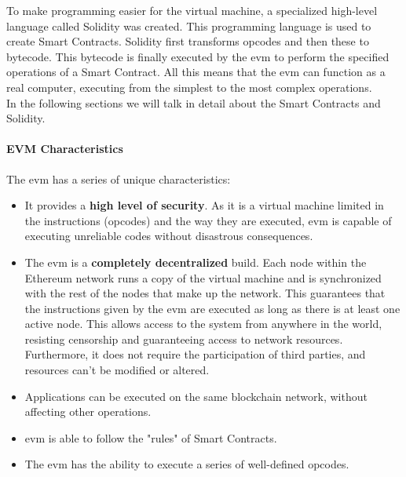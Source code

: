 \documentclass[a4paper, 12pt]{article} %
\begin{document}
                To make programming easier for the virtual machine, a specialized high-level language called Solidity was created. This programming language is used to create Smart Contracts. Solidity first transforms opcodes and then these to bytecode. This bytecode is finally executed by the \acrshort{evm} to perform the specified operations of a  Smart Contract. All this means that the \acrshort{evm} can function as a real computer, executing from the simplest to the most complex operations.\\
                
                In the following sections we will talk in detail about the Smart Contracts and Solidity.
                
            \paragraph{EVM Characteristics}
                The \acrshort{evm} has a series of unique characteristics\cite{ethereumGavin}\cite{ethereumDocu}:
                \begin{itemize}
                    \item It provides a \textbf{high level of security}. As it is a virtual machine limited in the instructions (opcodes) and the way they are executed, \acrshort{evm} is capable of executing unreliable codes without disastrous consequences.
                    \item The \acrshort{evm} is a \textbf{completely decentralized} build. Each node within the Ethereum network runs a copy of the virtual machine and is synchronized with the rest of the nodes that make up the network. This guarantees that the instructions given by the \acrshort{evm} are executed as long as there is at least one active node. This allows access to the system from anywhere in the world, resisting censorship and guaranteeing access to network resources. Furthermore, it does not require the participation of third parties, and resources can't be modified or altered.
                    \item Applications can be executed on the same blockchain network, without affecting other operations.
                    \item \acrshort{evm} is able to follow the "rules" of Smart Contracts.
                    \item The \acrshort{evm} has the ability to execute a series of well-defined opcodes.
                \end{itemize}
                
\end{document}
